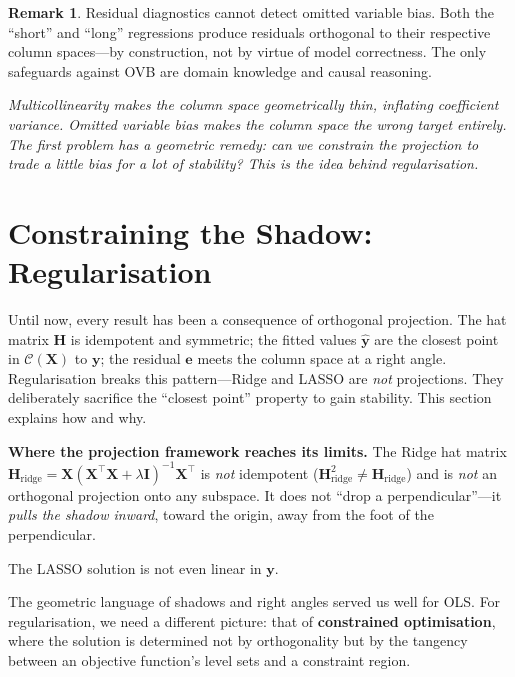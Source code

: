 \documentclass[11pt,a4paper]{article}
\theoremstyle{plain}
\theoremstyle{definition}
\newtheorem{remark}[theorem]{Remark}
\newcommand{\yhat}{\hat{\bm{y}}}
\newcommand{\bX}{\bm{X}}
\newcommand{\by}{\bm{y}}
\newcommand{\be}{\bm{e}}
\newcommand{\bH}{\bm{H}}
\newcommand{\bI}{\bm{I}}
\newcommand{\Col}{\mathcal{C}}
\begin{document}
\begin{remark}
Residual diagnostics cannot detect omitted variable bias. Both the
``short'' and ``long'' regressions produce residuals orthogonal to
their respective column spaces---by construction, not by virtue of
model correctness. The only safeguards against OVB are domain
knowledge and causal reasoning.
\end{remark}

\medskip
\noindent\textit{Multicollinearity makes the column space geometrically
thin, inflating coefficient variance.
Omitted variable bias makes the column space the wrong target entirely.
The first problem has a geometric remedy: can we \emph{constrain}
the projection to trade a little bias for a lot of stability?
This is the idea behind regularisation.}


\section{Constraining the Shadow: Regularisation}\label{sec:regularisation}

Until now, every result has been a consequence of orthogonal projection.
The hat matrix $\bH$ is idempotent and symmetric; the fitted values
$\yhat$ are the closest point in $\Col(\bX)$ to $\by$; the residual
$\be$ meets the column space at a right angle.
Regularisation breaks this pattern---Ridge and LASSO are \emph{not}
projections.
They deliberately sacrifice the ``closest point'' property to gain
stability.
This section explains how and why.

\begin{warning}
\textbf{Where the projection framework reaches its limits.}
The Ridge hat matrix
$\bH_{\text{ridge}} = \bX(\bX^\top\bX+\lambda\bI)^{-1}\bX^\top$
is \emph{not} idempotent
($\bH_{\text{ridge}}^2 \neq \bH_{\text{ridge}}$) and is \emph{not}
an orthogonal projection onto any subspace.
It does not ``drop a perpendicular''---it \emph{pulls the shadow
inward}, toward the origin, away from the foot of the perpendicular.

The LASSO solution is not even linear in $\by$.

The geometric language of shadows and right angles served us well for
OLS\@.  For regularisation, we need a different picture: that of
\textbf{constrained optimisation}, where the solution is determined
not by orthogonality but by the tangency between an objective function's
level sets and a constraint region.
\end{warning}
\end{document}
